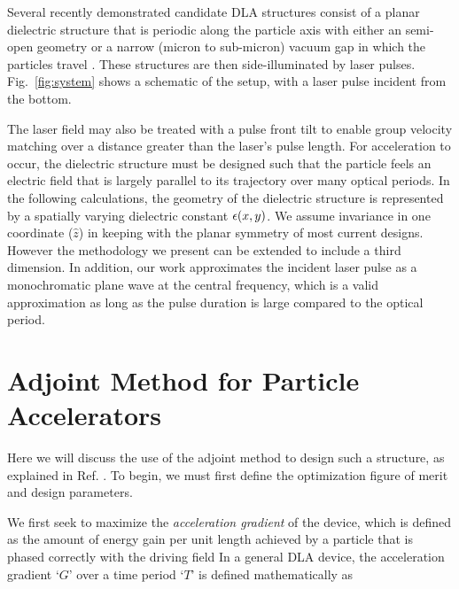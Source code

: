 Several recently demonstrated candidate DLA structures consist of a planar dielectric structure that is periodic along the particle axis with either an semi-open geometry or a narrow (micron to sub-micron) vacuum gap in which the particles travel \cite{plettner2006proposed, peralta2013demonstration, mcneur2016elements, leedle2015dielectric, chang2014silicon, breuer2014dielectric, breuer2014dielectric2, kozak2016dielectric}.
These structures are then side-illuminated by laser pulses. Fig.~\ref{fig:system} shows a schematic of the setup, with a laser pulse incident from the bottom.


The laser field may also be treated with a pulse front tilt \cite{hebling1996derivation, akturk2004pulse} to enable group velocity matching over a distance greater than the laser's pulse length.
For acceleration to occur, the dielectric structure must be designed such that the particle feels an electric field that is largely parallel to its trajectory over many optical periods.
In the following calculations, the geometry of the dielectric structure is represented by a spatially varying dielectric constant $\epsilon(x,y)$.
We assume invariance in one coordinate ($\hat{z}$) in keeping with the planar symmetry of most current designs.
However the methodology we present can be extended to include a third dimension.
In addition, our work approximates the incident laser pulse as a monochromatic plane wave at the central frequency, which is a valid approximation as long as the pulse duration is large compared to the optical period.

\section{Adjoint Method for Particle Accelerators}

Here we will discuss the use of the adjoint method to design such a structure, as explained in Ref. .
To begin, we must first define the optimization figure of merit and design parameters.

We first seek to maximize the \textit{acceleration gradient} of the device, which is defined as the amount of energy gain per unit length achieved by a particle that is phased correctly with the driving field
In a general DLA device, the acceleration gradient `$G$' over a time period `$T$' is defined mathematically as

